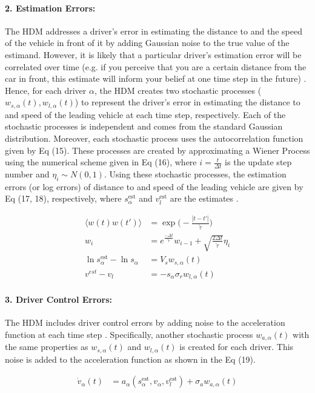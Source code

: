\documentclass[12pt]{article}
\begin{document}
\paragraph{2. Estimation Errors:}
The HDM addresses a driver's error in estimating the distance to and the speed of the vehicle in front of it by adding Gaussian noise to the true value of the estimand.  However, it is likely that a particular driver's estimation error will be correlated over time (e.g. if you perceive that you are a certain distance from the car in front, this estimate will inform your belief at one time step in the future) \cite{human_driver_model}. Hence, for each driver $\alpha$, the HDM creates two stochastic processes ($w_{s,\alpha}(t),w_{l,\alpha}(t)$) to represent the driver's error in estimating the distance to and speed of the leading vehicle at each time step, respectively.  Each of the stochastic processes is independent and comes from the standard Gaussian distribution.  Moreover, each stochastic process uses the autocorrelation function given by Eq (15). These processes are created by approximating a Wiener Process using the numerical scheme given in Eq (16), where $i=\frac{t}{\Delta t}$ is the update step number and $\eta_i \sim N(0,1)$.  Using these stochastic processes, the estimation errors (or log errors) of distance to and speed of the leading vehicle are given by Eq (17, 18), respectively, where $s_\alpha^\text{est}$ and $v_l^\text{est}$ are the estimates \cite[Chapter~12]{treiber_kesting_2013}.
\begin{mymathbox}[ams gather, title=Estimation Error Equations,colframe=blue!30!black]
  \begin{align}
  \langle w(t)w(t')\rangle&  =\exp\bigg(-\frac{|t-t'|}{\tilde{\tau}}\bigg)\\
  w_i&=e^{\frac{-\Delta t}{\tilde{\tau}}}w_{i-1}+\sqrt{\frac{2\Delta t}{\tilde\tau}}\eta_i\\
  \ln s_\alpha^{\text{est}} - \ln s_\alpha &= V_s w_{s,\alpha}(t)\\
  v^{est} - v_l &= -s_\alpha \sigma_r w_{l,\alpha}(t)
  \end{align}
\end{mymathbox}
\paragraph{3. Driver Control Errors:}
The HDM includes driver control errors by adding noise to the acceleration function at each time step \cite[Chapter~12]{treiber_kesting_2013}.  Specifically, another stochastic process $w_{a,\alpha}(t)$ with the same properties as $w_{s,\alpha}(t)$ and  $w_{l,\alpha}(t)$ is created for each driver.  This noise is added to the acceleration function as shown in the Eq (19).
\begin{mymathbox}[ams gather, title=Driver Control Error Equation Equations,colframe=blue!30!black]
  \begin{align}
\dot v_\alpha(t)&=a_\alpha(s_\alpha^\text{est},v_\alpha,v_l^\text{est})+\sigma_a w_{a,\alpha}(t)
  \end{align}
\end{mymathbox}
\end{document}

